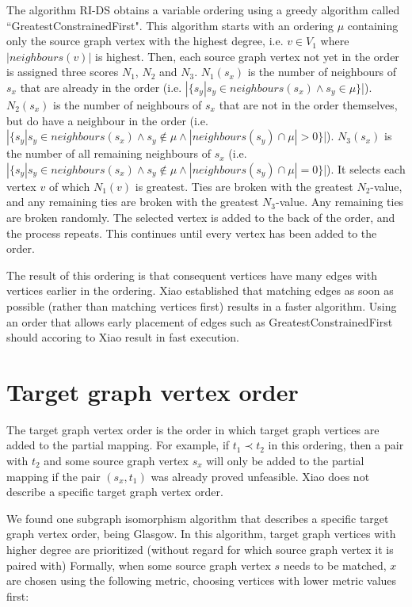 The algorithm RI-DS obtains a variable ordering using a greedy algorithm called ``GreatestConstrainedFirst". This algorithm starts with an ordering $\mu$ containing only the source graph vertex with the highest degree, i.e. $v\in V_1$ where $|\mathit{neighbours}(v)|$ is highest. Then, each source graph vertex not yet in the order is assigned three scores $N_1$, $N_2$ and $N_3$. $N_1(s_x)$ is the number of neighbours of $s_x$ that are already in the order (i.e. $|\{s_y | s_y \in \mathit{neighbours}(s_x) \land s_y \in \mu\}$|). $N_2(s_x)$ is the number of neighbours of $s_x$ that are not in the order themselves, but do have a neighbour in the order (i.e. $|\{s_y | s_y \in \mathit{neighbours}(s_x) \land s_y \not \in \mu \land |\mathit{neighbours}(s_y) \cap \mu| > 0\}$|). $N_3(s_x)$ is the number of all remaining neighbours of $s_x$ (i.e. $|\{s_y | s_y \in \mathit{neighbours}(s_x) \land s_y \not \in \mu \land |\mathit{neighbours}(s_y) \cap \mu| = 0\}$|). It selects each vertex $v$ of which $N_1(v)$ is greatest. Ties are broken with the greatest $N_2$-value, and any remaining ties are broken with the greatest $N_3$-value. Any remaining ties are broken randomly. The selected vertex is added to the back of the order, and the process repeats. This continues until every vertex has been added to the order.

The result of this ordering is that consequent vertices have many edges with vertices earlier in the ordering. Xiao established that matching edges as soon as possible (rather than matching vertices first) results in a faster algorithm. Using an order that allows early placement of edges such as GreatestConstrainedFirst should accoring to Xiao result in fast execution.
\section{Target graph vertex order}
\label{sec:targetOrder}

The target graph vertex order is the order in which target graph vertices are added to the partial mapping. For example, if $t_1 \prec t_2$ in this ordering, then a pair with $t_2$ and some source graph vertex $s_x$ will only be added to the partial mapping if the pair $(s_x, t_1)$ was already proved unfeasible. Xiao does not describe a specific target graph vertex order.

We found one subgraph isomorphism algorithm that describes a specific target graph vertex order, being Glasgow\cite{McCreesh2015}. In this algorithm, target graph vertices with higher degree are prioritized (without regard for which source graph vertex it is paired with) Formally, when some source graph vertex $s$ needs to be matched, $x$ are chosen using the following metric, choosing vertices with lower metric values first:

